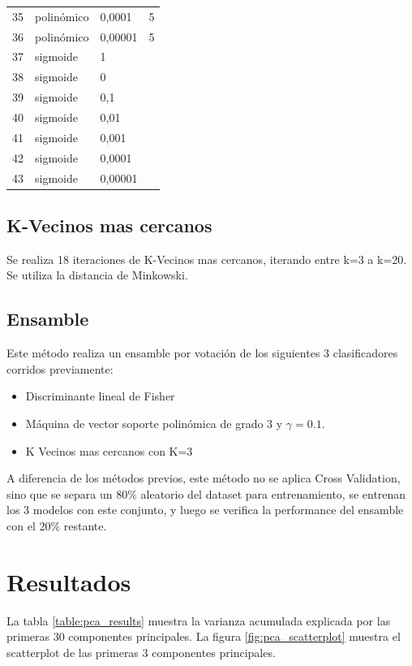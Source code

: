 \documentclass[journal]{IEEEtran}
\begin{document}
\begin{table}[ht!]
\begin{tabular}{l | l l l }
35 & polinómico & 0,0001  & 5 \\ 
36 & polinómico & 0,00001  & 5 \\ 
37 & sigmoide & 1 &  \\ 
38 & sigmoide & 0 &  \\ 
39 & sigmoide & 0,1 &  \\ 
40 & sigmoide & 0,01 &  \\ 
41 & sigmoide & 0,001 &  \\ 
42 & sigmoide & 0,0001 &  \\ 
43 & sigmoide & 0,00001 &  \\ 
\end{tabular}
\end{table}

\subsection{K-Vecinos mas cercanos}
Se realiza 18 iteraciones de K-Vecinos mas cercanos, iterando entre k=3
a k=20. Se utiliza la distancia de Minkowski.

\subsection{Ensamble}
Este método realiza un ensamble por votación de los siguientes 3
clasificadores corridos previamente:

\begin{itemize}
\item Discriminante lineal de Fisher
\item Máquina de vector soporte polinómica de grado 3 y $\gamma=0.1$. 
\item K Vecinos mas cercanos con K=3
\end{itemize}

A diferencia de los métodos previos, este método no se aplica
Cross Validation, sino que se separa un 80\% aleatorio del dataset para 
entrenamiento, se entrenan los 3 modelos con este conjunto, y luego
se verifica la performance del ensamble con el 20\% restante.

\section{Resultados}

La tabla \ref{table:pca_results} muestra la varianza acumulada explicada 
por las primeras 30 componentes principales. La figura \ref{fig:pca_scatterplot}
muestra el scatterplot de las primeras 3 componentes principales.
\end{document}
